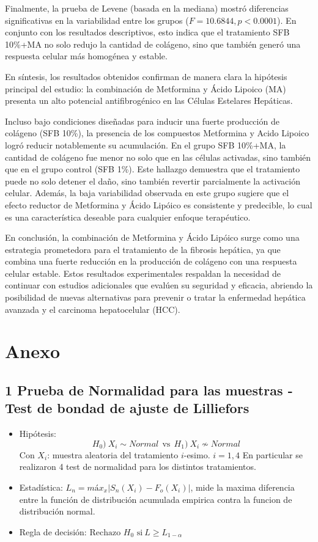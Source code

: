 \documentclass[
  11pt,
]{article}
\begin{document}
Finalmente, la prueba de Levene (basada en la mediana) mostró
diferencias significativas en la variabilidad entre los grupos
(\(F = 10.6844, p < 0.0001\)). En conjunto con los resultados
descriptivos, esto indica que el tratamiento SFB 10\%+MA no solo redujo
la cantidad de colágeno, sino que también generó una respuesta celular
más homogénea y estable.

En síntesis, los resultados obtenidos confirman de manera clara la
hipótesis principal del estudio: la combinación de Metformina y Ácido
Lipoico (MA) presenta un alto potencial antifibrogénico en las Células
Estelares Hepáticas.

Incluso bajo condiciones diseñadas para inducir una fuerte producción de
colágeno (SFB 10\%), la presencia de los compuestos Metformina y Acido
Lipoico logró reducir notablemente su acumulación. En el grupo SFB
10\%+MA, la cantidad de colágeno fue menor no solo que en las células
activadas, sino también que en el grupo control (SFB 1\%). Este hallazgo
demuestra que el tratamiento puede no solo detener el daño, sino también
revertir parcialmente la activación celular. Además, la baja
variabilidad observada en este grupo sugiere que el efecto reductor de
Metformina y Ácido Lipóico es consistente y predecible, lo cual es una
característica deseable para cualquier enfoque terapéutico.

En conclusión, la combinación de Metformina y Ácido Lipóico surge como
una estrategia prometedora para el tratamiento de la fibrosis hepática,
ya que combina una fuerte reducción en la producción de colágeno con una
respuesta celular estable. Estos resultados experimentales respaldan la
necesidad de continuar con estudios adicionales que evalúen su seguridad
y eficacia, abriendo la posibilidad de nuevas alternativas para prevenir
o tratar la enfermedad hepática avanzada y el carcinoma hepatocelular
(HCC).

\section{Anexo}\label{anexo}

\subsection{1 Prueba de Normalidad para las muestras - Test de bondad de
ajuste de
Lilliefors}\label{prueba-de-normalidad-para-las-muestras---test-de-bondad-de-ajuste-de-lilliefors}

\begin{itemize}
\item
  Hipótesis:
  \[H_0) \ X_i \sim Normal \ \ \text{vs} \ \ H_1) \ X_i \nsim Normal\]
  Con \(X_i\): muestra aleatoria del tratamiento \(i\)-esimo.
  \(i = 1,4\) En particular se realizaron 4 test de normalidad para los
  distintos tratamientos.
\item
  Estadística: \(L_n = máx_x |S_n(X_i) - F_o(X_i)|\), mide la maxima
  diferencia entre la función de distribución acumulada empirica contra
  la funcion de distribución normal.
\item
  Regla de decisión:
  \(\text{Rechazo } H_0 \text{ si} \ L \ge L_{1 - \alpha}\)
\end{itemize}
\end{document}
